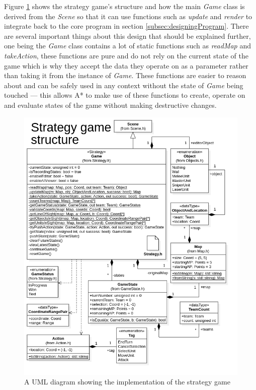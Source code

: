 \documentclass[11pt, a4paper]{report}
\begin{document}
Figure \ref{fig:strategyGameUML} shows the strategy game's structure and how the main \emph{Game} class is derived from the \emph{Scene} so that it can use functions such as \emph{update} and \emph{render} to integrate back to the core program in section \ref{subsec:designingProgram}. There are several important things about this design that should be explained further, one being the \emph{Game} class contains a lot of static functions such as \emph{readMap} and \emph{takeAction}, these functions are pure and do not rely on the current state of the game which is why they accept the data they operate on as a parameter rather than taking it from the instance of \emph{Game}. These functions are easier to reason about and can be safely used in any context without the state of \emph{Game} being touched --- this allows A* to make use of these functions to create, operate on and evaluate states of the game without making destructive changes.

\begin{figure}[!h]
  \centering
  \includegraphics[width=\linewidth]{img/strategy_game_structure.png}
  \caption{A UML diagram showing the implementation of the strategy game}
  \label{fig:strategyGameUML}
\end{figure}
\end{document}
